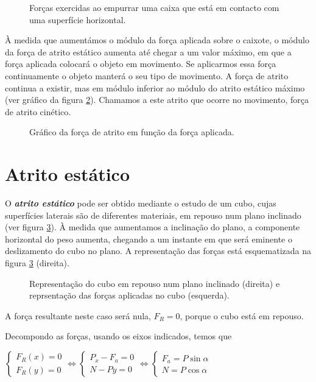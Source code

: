 \documentclass{article}
\newcommand{\toliv}[1]{\textcolor{olive!80}{\textbf{#1}}}
\begin{document}
	\begin{figure}[H]
		\centering
		\resizebox{0.9\linewidth}{!}{%
			
		}
		\caption{Forças exercidas ao empurrar uma caixa que está em contacto com uma superfície horizontal.}
		\label{fig:pushblock}
	\end{figure}
	
	À medida que aumentámos o módulo da força aplicada sobre o caixote, o módulo da força de atrito estático aumenta até chegar a um valor máximo, em que a força aplicada colocará o objeto em movimento. Se aplicarmos essa força continuamente o objeto manterá o seu tipo de movimento. A força de atrito continua a existir, mas em módulo inferior ao módulo do atrito estático máximo (ver gráfico da figura \ref{fig:atrito_graf}). Chamamos a este atrito que ocorre no movimento, força de atrito cinético.
		
	\begin{figure}[H]
		\centering
		\resizebox{0.7\linewidth}{!}{%
			
		}
		\caption{Gráfico da força de atrito em função da força aplicada.}
		\label{fig:atrito_graf}
	\end{figure}
	
	\section{Atrito estático}
	
	O \toliv{\textbf{\textit{atrito estático}}} pode ser obtido mediante o estudo de um cubo, cujas superfícies laterais são de diferentes materiais, em repouso num plano inclinado (ver figura \ref{fig:atritoestatico}). À medida que aumentamos a inclinação do plano, a componente horizontal do peso aumenta, chegando a um instante em que será eminente o deslizamento do cubo no plano. A representação das forças está esquematizada na figura \ref{fig:atritoestatico} (direita). 
	
	\begin{figure}[H]
		\centering
		\resizebox{0.9\linewidth}{!}{%
			
		}
		\caption{Representação do cubo em repouso num plano inclinado (direita) e reprsentação das forças aplicadas no cubo (esquerda).}
		\label{fig:atritoestatico}
	\end{figure}
	
	A força resultante neste caso será nula, $F_R = 0$, porque o cubo está em repouso. 
	
	Decompondo as forças, usando os eixos indicados, temos que
	
	\begin{center}
		$
		\begin{cases}
			F_R(x) = 0\\
			F_R(y) = 0
		\end{cases}
		\Leftrightarrow
		\begin{cases}
			P_x - F_a = 0\\
			N - Py = 0
		\end{cases}
		\Leftrightarrow
		\begin{cases}
			F_a = P \sin \alpha\\
			N = P \cos \alpha
		\end{cases}
		$
	\end{center}
	
\end{document}
